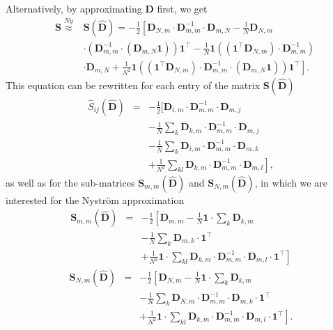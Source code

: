 \documentclass[twoside,11pt]{article}
\begin{document}
Alternatively, by approximating $\mathbf{D}$ first, we get
\begin{eqnarray}
&\mathbf{S} \overset{Ny}{\approx}& \mathbf{S(\hat{D})}
  = -\frac{1}{2} \left[ \mathbf{D}_{N,m} \cdot \mathbf{D}_{m,m}^{-1} \cdot \mathbf{D}_{m,N} -\frac{1}{N} \mathbf{D}_{N,m} \right. \label{eq:dis_to_sim} \\
  & & \left.\cdot (\mathbf{D}_{m,m}^{-1} \cdot (\mathbf{D}_{m,N} \mathbf{1} )) \mathbf{1}^\top -\frac{1}{N} \mathbf{1} ((\mathbf{1}^\top \mathbf{D}_{N,m})  \cdot \mathbf{D}_{m,m}^{-1}) \right.
\nonumber\\
  & & \left.  \cdot \mathbf{D}_{m,N}
	  +\frac{1}{N^2} \mathbf{1} (( \mathbf{1}^\top  \mathbf{D}_{N,m}) \cdot
	   \mathbf{D}_{m,m}^{-1} \cdot (\mathbf{D}_{m,N} \mathbf{1}))\mathbf{1}^\top
	   \right]. \nonumber
\end{eqnarray}
This equation can be rewritten for each entry of the matrix $\mathbf{S(\hat{D})}$
\begin{eqnarray*}
\hat{S}_{ij}(\mathbf{\hat{D}})
  &=& -\frac{1}{2} \Bigg[ \mathbf{D}_{i,m} \cdot \mathbf{D}_{m,m}^{-1} \cdot \mathbf{D}_{m,j} \\
  & &    -\frac{1}{N} \sum_k \mathbf{D}_{k,m} \cdot \mathbf{D}_{m,m}^{-1} \cdot
       \mathbf{D}_{m,j} \\
  & & \left.
      -\frac{1}{N} \sum_k \mathbf{D}_{i,m} \cdot \mathbf{D}_{m,m}^{-1} \cdot
       \mathbf{D}_{m,k}\right.\nonumber\\
  & &  \left.    +\frac{1}{N^2} \sum_{kl} \mathbf{D}_{k,m} \cdot
       \mathbf{D}_{m,m}^{-1} \cdot \mathbf{D}_{m,l}
      \right], \nonumber
\end{eqnarray*}
as well as for the sub-matrices $\mathbf{S}_{m,m}(\mathbf{\hat{D}})$ and $\mathbf{S}_{N,m}(\mathbf{\hat{D}})$,
in which we are interested for the Nystr\"om approximation 
\begin{eqnarray*}
\mathbf{S}_{m,m}(\mathbf{\hat{D}})
  &=& -\frac{1}{2} \left[ \mathbf{D}_{m,m}
      -\frac{1}{N} \mathbf{1} \cdot \sum_k \mathbf{D}_{k,m} \right. \\
  & & \left.
      -\frac{1}{N} \sum_k \mathbf{D}_{m,k} \cdot \mathbf{1}^\top \right.\nonumber\\
  &&  \left.     +\frac{1}{N^2} \mathbf{1} \cdot \sum_{kl} \mathbf{D}_{k,m} \cdot
       \mathbf{D}_{m,m}^{-1} \cdot \mathbf{D}_{m,l} \cdot \mathbf{1}^\top
      \right] \nonumber
\end{eqnarray*}
\begin{eqnarray*}
\mathbf{S}_{N,m}(\mathbf{\hat{D}})
  &=& -\frac{1}{2} \left[ \mathbf{D}_{N,m}
      -\frac{1}{N} \mathbf{1} \cdot \sum_k \mathbf{D}_{k,m} \right. \\
  & & \left.
      -\frac{1}{N} \sum_k \mathbf{D}_{N,m} \cdot \mathbf{D}_{m,m}^{-1} \cdot
       \mathbf{D}_{m,k} \cdot \mathbf{1}^\top\right. \nonumber\\
  & & \left.    +\frac{1}{N^2} \mathbf{1} \cdot \sum_{kl} \mathbf{D}_{k,m} \cdot
       \mathbf{D}_{m,m}^{-1} \cdot \mathbf{D}_{m,l} \cdot \mathbf{1}^\top
      \right]. \nonumber
\end{eqnarray*}
\end{document}
